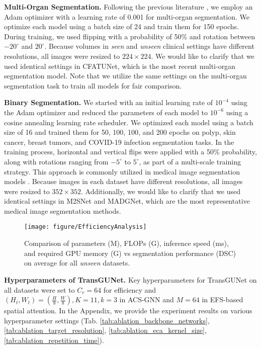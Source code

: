 \noindent\textbf{Multi-Organ Segmentation.} Following the previous literature \cite{wang2024cfatransunet}, we employ an Adam optimizer with a learning rate of 0.001 for multi-organ segmentation. We optimize each model using a batch size of 24 and train them for 150 epochs. During training, we used flipping with a probability of 50\% and rotation between $-20^{\circ}$ and $20^{\circ}$. Because volumes in \textit{seen} and \textit{unseen} clinical settings have different resolutions, all images were resized to $224 \times 224$. We would like to clarify that we used identical settings in CFATUNet, which is the most recent multi-organ segmentation model. Note that we utilize the same settings on the multi-organ segmentation task to train all models for fair comparison.

\noindent\textbf{Binary Segmentation.} We started with an initial learning rate of $10^{-4}$ using the Adam optimizer and reduced the parameters of each model to $10^{-6}$ using a cosine annealing learning rate scheduler. We optimized each model using a batch size of 16 and trained them for 50, 100, 100, and 200 epochs on polyp, skin cancer, breast tumors, and COVID-19 infection segmentation tasks. In the training process, horizontal and vertical flips were applied with a 50\% probability, along with rotations ranging from $-5^{\circ}$ to $5^{\circ}$, as part of a multi-scale training strategy. This approach is commonly utilized in medical image segmentation models \cite{fan2020pranet, zhao2021automatic, zhao2023m, nam2024modality}. Because images in each dataset have different resolutions, all images were resized to $352 \times 352$. Additionally, we would like to clarify that we used identical settings in M2SNet and MADGNet, which are the most representative medical image segmentation methods.

\begin{figure}[t]
    \centering
    \texttt{[image: figure/EfficiencyAnalysis]}
        \caption{Comparison of parameters (M), FLOPs (G), inference speed (ms), and required GPU memory (G) vs segmentation performance (DSC) on average for all \textit{unseen} datasets.} \vspace{-0.50cm}
    \label{fig:EfficiencyAnalysis}
\end{figure}

\noindent\textbf{Hyperparameters of TransGUNet.} Key hyperparameters for TransGUNet on all datasets were set to $C_{r} = 64$ for efficiency and $(H_{t}, W_{t}) = (\frac{H}{8}, \frac{W}{8}), K = 11, k = 3$ in ACS-GNN and $M = 64$ in EFS-based spatial attention. In the Appendix, we provide the experiment results on various hyperparameter settings (Tab. \ref{tab:ablation_backbone_networks},
\ref{tab:ablation_target_resolution},
\ref{tab:ablation_eca_kernel_size}, \ref{tab:ablation_repetition_time}).

